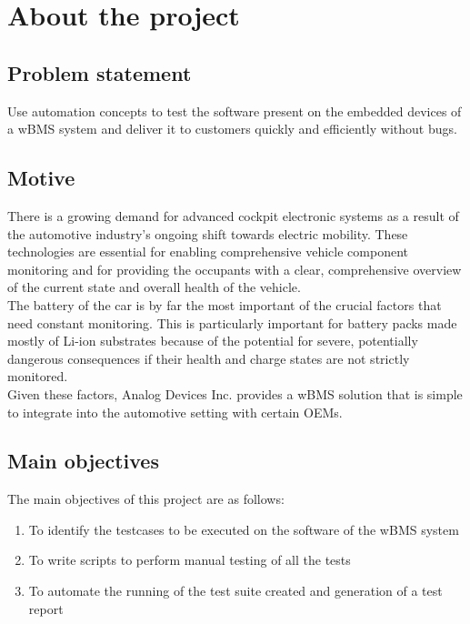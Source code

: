 \chapter{About the project} %

\label{ch:about}


\section{Problem statement}
Use automation concepts to test the software present on the embedded devices of a wBMS system and deliver it to customers quickly and efficiently without bugs.

\section{Motive}
There is a growing demand for advanced cockpit electronic systems as a result of the automotive industry's ongoing shift towards electric mobility. These technologies are essential for enabling comprehensive vehicle component monitoring and for providing the occupants with a clear, comprehensive overview of the current state and overall health of the vehicle. \\
The battery of the car is by far the most important of the crucial factors that need constant monitoring. This is particularly important for battery packs made mostly of Li-ion substrates because of the potential for severe, potentially dangerous consequences if their health and charge states are not strictly monitored. \\
Given these factors, Analog Devices Inc. provides a wBMS solution that is simple to integrate into the automotive setting with certain OEMs.
\newpage
\section{Main objectives}
The main objectives of this project are as follows:
\begin{enumerate}
    \item To identify the testcases to be executed on the software of the wBMS system
    \item To write scripts to perform manual testing of all the tests
    \item To automate the running of the test suite created and generation of a test report
\end{enumerate}